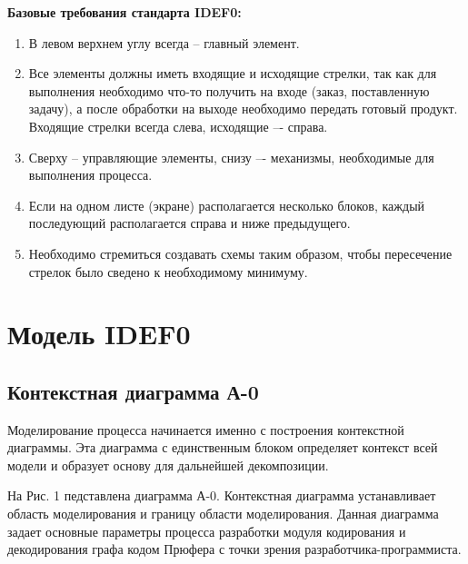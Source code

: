 \documentclass[a4paper, final]{article}
\begin{document}
{\bf Базовые требования стандарта IDEF0:}
\begin{enumerate}
	\item В левом верхнем углу всегда -- главный элемент.
	\item Все элементы должны иметь входящие и исходящие стрелки, так как для выполнения необходимо что-то
	получить на входе (заказ, поставленную задачу), а после обработки на выходе необходимо передать готовый
	продукт. Входящие стрелки всегда слева, исходящие –- справа.
	\item Сверху – управляющие элементы, снизу –- механизмы, необходимые для выполнения процесса.
	\item Если на одном листе (экране) располагается несколько блоков, каждый последующий располагается справа
	и ниже предыдущего.
	\item Необходимо стремиться создавать схемы таким образом, чтобы пересечение стрелок 
	было сведено к необходимому минимуму. \cite{bib:gost_idef0}
\end{enumerate}




\newpage
\section{Модель IDEF0}


\subsection{Контекстная диаграмма А-0}

Моделирование процесса начинается именно с построения контекстной диаграммы. Эта диаграмма с единственным блоком определяет
контекст всей модели и образует основу для дальнейшей декомпозиции. 
\par На Рис. 1 педставлена диаграмма А-0. Контекстная диаграмма устанавливает область моделирования и границу 
области моделирования. Данная диаграмма задает основные параметры процесса разработки модуля кодирования и декодирования графа
кодом Прюфера с точки зрения разработчика-программиста. 
\end{document}
